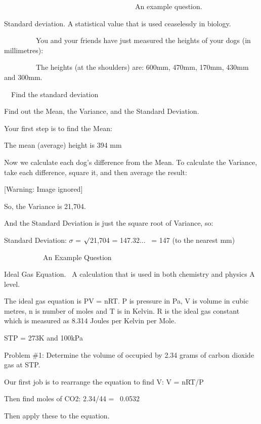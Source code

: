 \documentclass{article}
\begin{document}
\bigskip

\ \ \ \ \ \ \ \ \ \ \ \ \ \ \ \ \ \ \ \ \ \ \ \ \ \ \ \ \ \ \ \ \ \ \ \ \ An example question.\ \ 

Standard deviation. A statistical value that is used ceaselessly in biology.

\ \ \ \ \ \ \ \ \ You and your friends have just measured the heights of your dogs (in millimetres):\newline


\ \ \ \ \ \ \ \ \ The heights (at the shoulders) are: 600mm, 470mm, 170mm, 430mm and 300mm.

\ \ Find the standard deviation

Find out the Mean, the Variance, and the Standard Deviation.

Your first step is to find the Mean:

The mean (average) height is 394 mm

Now we calculate each dog's difference from the Mean. To calculate the Variance, take each difference, square it, and then average the result:

  [Warning: Image ignored] %
 

So, the Variance is 21,704.

And the Standard Deviation is just the square root of Variance, so:

Standard Deviation: $\sigma $ = ${\surd}$21,704 = 147.32... \ = 147 (to the nearest mm)


\bigskip


\bigskip

\ \ \ \ \ \ \ \ \ \ \ An Example Question

Ideal Gas Equation. \ A calculation that is used in both chemistry and physics A level.

The ideal gas equation is PV = nRT. P is pressure in Pa, V is volume in cubic metres, n is number of moles and T is in Kelvin. R is the ideal gas constant which is measured as 8.314 Joules per Kelvin per Mole.

STP = 273K and 100kPa

Problem \#1: Determine the volume of occupied by 2.34 grams of carbon dioxide gas at STP.

Our first job is to rearrange the equation to find V: V = nRT/P

Then find moles of CO2: 2.34/44 = \ 0.0532

Then apply these to the equation.
\end{document}
